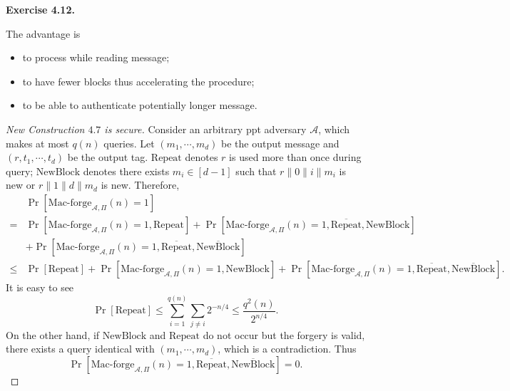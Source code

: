 \documentclass[a4paper]{article}
\newtheorem*{proof}{Proof}
\newenvironment{exercise}[1]{
	\par
	\noindent\textbf{Exercise #1.}\quad
}{
	\par
	\bigskip
}
\newcommand{\sbra}[1]{\left[ #1 \right]}
\newcommand{\Macforge}{\mathrm{Mac}\text{-}\mathrm{forge}}
\newcommand{\ppt}{{\sc ppt} }
\begin{document}
\begin{exercise}{4.12}
The advantage is 
\begin{itemize}
    \item to process while reading message;
    \item to have fewer blocks thus accelerating the procedure;
    \item to be able to authenticate potentially longer message.
\end{itemize}
\begin{proof}[New Construction $4.7$ is secure]
    Consider an arbitrary \ppt adversary $\mathcal A$, which makes at most $q(n)$ queries.
    Let $(m_1,\cdots,m_d)$ be the output message and $(r,t_1,\cdots,t_d)$ be the output tag.
    $\mathrm{Repeat}$ denotes $r$ is used more than once during query;
    $\mathrm{NewBlock}$ denotes there exists $m_i\in[d-1]$ such that $r\|0\|i\|m_i$ is new
    or $r\|1\|d\|m_d$ is new.
    Therefore, 
    \begin{align*}
        &\Pr\sbra{\Macforge_{\mathcal A,\Pi}(n)=1}\\
        =&\Pr\sbra{\Macforge_{\mathcal A,\Pi}(n)=1,\mathrm{Repeat}}
        +\Pr\sbra{\Macforge_{\mathcal A,\Pi}(n)=1,\overline{\mathrm{Repeat}},\mathrm{NewBlock}}\\
        &+\Pr\sbra{\Macforge_{\mathcal A,\Pi}(n)=1,\overline{\mathrm{Repeat}},\overline{\mathrm{NewBlock}}}\\
        \leq&\Pr\sbra{\mathrm{Repeat}}
        +\Pr\sbra{\Macforge_{\mathcal A,\Pi}(n)=1,\mathrm{NewBlock}}
        +\Pr\sbra{\Macforge_{\mathcal A,\Pi}(n)=1,\overline{\mathrm{Repeat}},\overline{\mathrm{NewBlock}}}.
    \end{align*}
    It is easy to see
    $$
        \Pr\sbra{\mathrm{Repeat}}\leq\sum_{i=1}^{q(n)}\sum_{j\neq i}2^{-n/4}\leq\frac{q^2(n)}{2^{n/4}}.
    $$
    On the other hand, if $\mathrm{NewBlock}$ and $\mathrm{Repeat}$ do not occur but the forgery is valid,
    there exists a query identical with $(m_1,\cdots,m_d)$, which is a contradiction. Thus
    $$
    \Pr\sbra{\Macforge_{\mathcal A,\Pi}(n)=1,\overline{\mathrm{Repeat}},\overline{\mathrm{NewBlock}}}=0. 
    $$
    

\end{proof}
\end{exercise}
\end{document}
